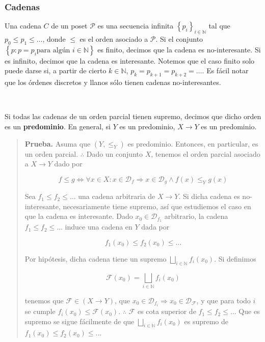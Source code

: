 \documentclass[article, 12pt]{article}
\begin{document}
\subsubsection{Cadenas}

Una cadena $C$ de un poset $\mathcal{P}$ es una secuencia infinita $\left\{ p_i
\right\}_{i \in \mathbb{N}} $ tal que $p_0 \leq p_1 \leq \ldots$, donde $\leq$
es el orden asociado a $\mathcal{P}$. Si el conjunto $\left\{ p : p = p_i \text{
para algún } i \in \mathbb{N} \right\} $ es finito, decimos que la cadena es
no-interesante. Si es infinito, decimos que la cadena es interesante. Notemos
que el caso finito solo puede darse si, a partir de cierto $k \in \mathbb{N}$,
$p_k = p_{k+1} = p_{k+2} = \ldots$. Es fácil notar que los órdenes discretos y
llanos sólo tienen cadenas no-interesantes.

~

Si todas las cadenas de un orden parcial tienen supremo, decimos que dicho orden
es un \textbf{predominio}. En general, si $Y$ es un predominio, $X \to Y$ es un
predominio.



\small
\begin{quote}

\textbf{Prueba.} Asuma que $\left( Y, \leq_Y \right) $ es predominio. Entonces,
en particular, es un orden parcial. $\therefore $ Dado un conjunto $X$, tenemos
el orden parcial asociado a $X \to Y$ dado por 

\begin{equation*}
  f \leq g \iff \forall x \in X : x \in \mathcal{D}_f \Rightarrow x \in \mathcal{D}_g \land f(x)
  \leq_Y g(x)
\end{equation*}

Sea $f_1 \leq f_2 \leq \ldots$ una cadena arbitraria de $X \to Y$. Si dicha
cadena es no-interesante, necesariamente tiene supremo, así que estudiemos el
caso en que la cadena es interesante. Dado $x_0 \in \mathcal{D}_{f_1}$ arbitrario, la cadena
$f_1 \leq f_2 \leq \ldots$ induce una cadena en $Y$ dada por 

\begin{equation*}
  f_1(x_0) \leq f_2(x_0) \leq \ldots
\end{equation*}

Por hipótesis, dicha cadena tiene un supremo $\bigsqcup_{i \in \mathbb{N}}
f_i(x_0)$. Si definimos 

$$\mathcal{F}(x_0) = \bigsqcup_{i \in \mathbb{N}} f_i(x_0)$$

tenemos que $\mathcal{F} \in (X \to Y)$, que $x_0 \in \mathcal{D}_{f_i}
\Rightarrow x_0\in \mathcal{D}_{\mathcal{F}}$, y que para todo $i$ se cumple
$f_i(x_0) \leq \mathcal{F}(x_0)$. $\therefore $ $\mathcal{F}$ es cota superior
de $f_1 \leq f_2 \leq \ldots$ Que es supremo se sigue fácilmente de que 
$\bigsqcup_{i \in \mathbb{N}} f_i(x_0)$ es supremo de $f_1(x_0) \leq f_2(x_0)
\leq \ldots$


\end{quote}
\normalsize
\end{document}

